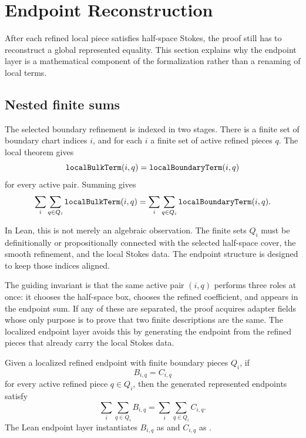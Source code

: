 \section{Endpoint Reconstruction}
\label{sec:endpoint-reconstruction}

After each refined local piece satisfies half-space Stokes, the proof still has
to reconstruct a global represented equality.  This section explains why the
endpoint layer is a mathematical component of the formalization rather than a
renaming of local terms.

\subsection{Nested finite sums}

The selected boundary refinement is indexed in two stages.  There is a finite
set of boundary chart indices \(i\), and for each \(i\) a finite set of active
refined pieces \(q\).  The local theorem gives
\[
  \code{localBulkTerm}(i,q)=\code{localBoundaryTerm}(i,q)
\]
for every active pair.  Summing gives
\[
  \sum_i\sum_{q\in Q_i}\code{localBulkTerm}(i,q)
  =
  \sum_i\sum_{q\in Q_i}\code{localBoundaryTerm}(i,q).
\]

In Lean, this is not merely an algebraic observation.  The finite sets
\(Q_i\) must be definitionally or propositionally connected with the selected
half-space cover, the smooth refinement, and the local Stokes data.  The
endpoint structure is designed to keep those indices aligned.

The guiding invariant is that the same active pair \((i,q)\) performs three
roles at once: it chooses the half-space box, chooses the refined coefficient,
and appears in the endpoint sum.
If any of these are separated, the proof acquires adapter fields whose only
purpose is to prove that two finite descriptions are the same.  The localized
endpoint layer avoids this by generating the endpoint from the refined pieces
that already carry the local Stokes data.

\begin{lemma}
\label{lem:endpoint-summation}
Given a localized refined endpoint with finite boundary pieces \(Q_i\), if
\[
  B_{i,q}=C_{i,q}
\]
for every active refined piece \(q\in Q_i\), then the generated represented
endpoints satisfy
\[
  \sum_i\sum_{q\in Q_i} B_{i,q}
  =
  \sum_i\sum_{q\in Q_i} C_{i,q}.
\]
The Lean endpoint layer instantiates \(B_{i,q}\) as
 and \(C_{i,q}\) as
.
\end{lemma}

